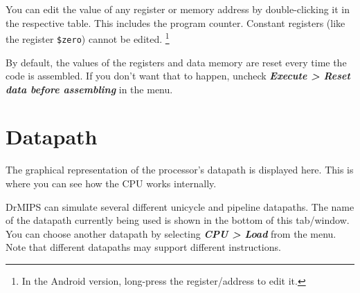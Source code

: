 \documentclass[11pt,a4paper,twoside,titlepage]{report}
\newcommand{\menupath}[1]{\textbf{\emph{#1}}}
\begin{document}
You can edit the value of any register or memory address by double-clicking
it in the respective table. This includes the program counter.
Constant registers (like the register \verb+$zero+) cannot be edited.
\footnote{In the Android version, long-press the register/address to edit it.}

By default, the values of the registers and data memory are reset every time
the code is assembled.
If you don't want that to happen, uncheck 
\menupath{Execute > Reset data before assembling} in the menu.


\section{Datapath}

The graphical representation of the processor's datapath is displayed here.
This is where you can see how the CPU works internally.

DrMIPS can simulate several different unicycle and pipeline datapaths.
The name of the datapath currently being used is shown in the bottom of this
tab/window. You can choose another datapath by selecting 
\menupath{CPU > Load} from the menu.
Note that different datapaths may support different instructions.
\end{document}
